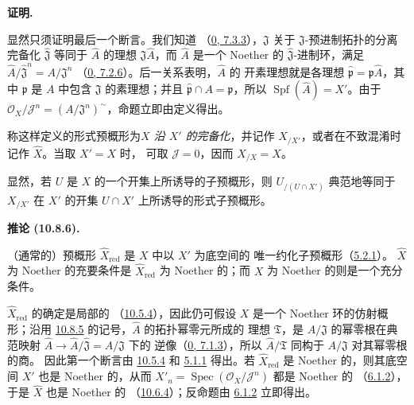 \documentclass[UTF8,fontset=none,11pt,oneside,openany]{ctexbook}
\newenvironment{corollary}[1][]{%
  \par\medskip\noindent\textbf{推论 (#1).}\ %
}{\par}
\newenvironment{proof}{%
  \par\medskip\noindent\textbf{证明.}\ %
}{\par}
\newcommand{\oldpage}[2][]{%
  \hypertarget{ega-source-page-#1-#2}{}%
  \marginnote{\scriptsize\textbf{#1}~|~#2}\ignorespaces}
\let\EGAOriginalLabel\label
\renewcommand{\label}[1]{\phantomsection\EGAOriginalLabel{#1}}
\begin{document}
\begin{proof}
显然只须证明最后一个断言。我们知道
（\hyperref[0.7.3.3-fr]{0, 7.3.3}），$\mathfrak{J}$ 关于
$\mathfrak{J}$-预进制拓扑的分离完备化 $\widehat{\mathfrak{J}}$
等同于 $\widehat A$ 的理想 $\mathfrak{J}\widehat A$，而
$\widehat A$ 是一个 Noether 的 $\widehat{\mathfrak{J}}$-进制环，满足
$\widehat A/\widehat{\mathfrak{J}}^n=A/\mathfrak{J}^n$
（\hyperref[0.7.2.6-fr]{0, 7.2.6}）。后一关系表明，$\widehat A$ 的
开素理想就是各理想
$\widehat{\mathfrak p}=\mathfrak p\widehat A$，其中 $\mathfrak p$ 是
$A$ 中包含 $\mathfrak{J}$ 的素理想；并且
$\widehat{\mathfrak p}\cap A=\mathfrak p$，所以
$\operatorname{Spf}(\widehat A)=X'$。由于
$\mathscr{O}_X/\mathscr{J}^n=(A/\mathfrak{J}^n)^{\sim}$，命题立即由定义得出。
\end{proof}

称这样定义的形式预概形为\emph{$X$ 沿 $X'$ 的完备化}，并记作
$X_{/X'}$，或者在不致混淆时记作 $\widehat X$。当取 $X'=X$ 时，
可取 $\mathscr{J}=0$，因而 $X_{/X}=X$。

显然，若 $U$ 是 $X$ 的一个开集上所诱导的子预概形，则
$U_{/(U\cap X')}$ 典范地等同于 $X_{/X'}$ 在 $X'$ 的开集
$U\cap X'$ 上所诱导的形式子预概形。

\begin{corollary}[10.8.6]
\label{I.10.8.6-fr}
（通常的）预概形 $\widehat X_{\mathrm{red}}$ 是 $X$ 中以 $X'$ 为底空间的
唯一约化子预概形（\hyperref[I.5.2.1-fr]{5.2.1}）。
$\widehat X$ 为 Noether 的充要条件是 $\widehat X_{\mathrm{red}}$ 为
Noether 的；而 $X$ 为 Noether 的则是一个充分条件。
\end{corollary}

\oldpage[I]{196}

$\widehat X_{\mathrm{red}}$ 的确定是局部的
（\hyperref[I.10.5.4-fr]{10.5.4}），因此仍可假设 $X$ 是一个 Noether
环的仿射概形；沿用
\hyperref[I.10.8.5-fr]{10.8.5} 的记号，$\widehat A$ 的拓扑幂零元所成的
理想 $\mathfrak{T}$，是 $A/\mathfrak{J}$ 的幂零根在典范映射
$\widehat A\to\widehat A/\widehat{\mathfrak{J}}=A/\mathfrak{J}$ 下的
逆像（\hyperref[0.7.1.3-fr]{0, 7.1.3}），所以
$\widehat A/\mathfrak{T}$ 同构于 $A/\mathfrak{J}$ 对其幂零根的商。
因此第一个断言由 \hyperref[I.10.5.4-fr]{10.5.4} 和
\hyperref[I.5.1.1-fr]{5.1.1} 得出。若
$\widehat X_{\mathrm{red}}$ 是 Noether 的，则其底空间 $X'$ 也是
Noether 的，从而
$X'_n=\operatorname{Spec}(\mathscr{O}_X/\mathscr{J}^n)$ 都是 Noether 的
（\hyperref[I.6.1.2-fr]{6.1.2}），于是 $\widehat X$ 也是 Noether 的
（\hyperref[I.10.6.4-fr]{10.6.4}）；反命题由
\hyperref[I.6.1.2-fr]{6.1.2} 立即得出。
\end{document}
